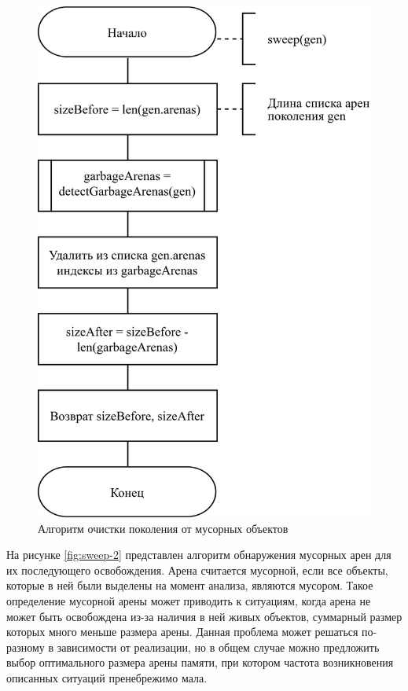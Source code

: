 \begin{figure}[H]
	\centering
	\includegraphics[scale=0.185]{assets/sweep-1.png}
	\caption{Алгоритм очистки поколения от мусорных объектов}
	\label{fig:sweep-1}
\end{figure}

На рисунке \ref{fig:sweep-2} представлен алгоритм обнаружения мусорных арен для их последующего освобождения. Арена считается мусорной, если все объекты, которые в ней были выделены на момент анализа, являются мусором. Такое определение мусорной арены может приводить к ситуациям, когда арена не может быть освобождена из-за наличия в ней живых объектов, суммарный размер которых много меньше размера арены. Данная проблема может решаться по-разному в зависимости от реализации, но в общем случае можно предложить выбор оптимального размера арены памяти, при котором частота возникновения описанных ситуаций пренебрежимо мала.

